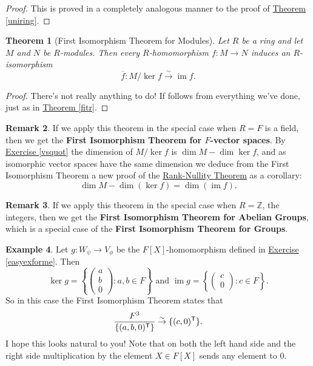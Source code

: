 \documentclass[11pt]{amsbook}
\DeclareMathOperator{\im}{\mathrm{im}}
\newtheorem{theorem}{Theorem}[section]
\theoremstyle{definition}
\newtheorem{rem}[theorem]{Remark}
\newtheorem{ex}[theorem]{Example}
\begin{document}
\begin{proof} This is proved in a completely analogous manner to the proof of \hyperref[uniring]{Theorem \ref{uniring}}.
\end{proof}

\begin{theorem}[First Isomorphism Theorem for Modules] \label{fitm}
Let $R$ be a ring and let $M$ and $N$ be $R$-modules. Then every $R$-homomorphism $f : M\longrightarrow N$ induces an $R$-isomorphism $$\overline{f}: M/\ker f \stackrel{\sim}{\to} \im f.$$
\end{theorem}

\begin{proof}
There's not really anything to do! If follows from everything we've done, just as in \hyperref[fitr]{Theorem \ref{fitr}}.
 \end{proof}

\begin{rem}
If we apply this theorem in the special case when $R= F$ is a field, then we get the {\bf First Isomorphism Theorem for $F$-vector spaces}. By \hyperref[vsquot]{Exercise \ref{vsquot}} the dimension of $M/\ker f$ is $\dim M - \dim \ker f$, and as isomorphic vector spaces have the same dimension we deduce from the First Isomorphism Theorem a new proof of the \hyperref[rnthm]{Rank-Nullity Theorem} as a corollary:
$$\dim M - \dim (\ker f) = \dim (\im f).$$
\end{rem}

\begin{rem}
If we apply this theorem in the special case when $R= \mathbb{Z}$, the integers, then we get the {\bf First Isomorphism Theorem for Abelian Groups}, which is a special case of the {\bf First Isomorphism Theorem for Groups}.
\end{rem}

\begin{ex}
Let $g: W_{\psi} \to V_{\phi}$ be the $F[X]$-homomorphism defined in \hyperref[easyexforme]{Exercise \ref{easyexforme}}. Then $$\ker g = \left\{ \begin{pmatrix} a \\ b\\ 0 \end{pmatrix} : a,b \in F \right\} \text{ and } \im g = \left\{ \begin{pmatrix} c \\ 0 \end{pmatrix} : c\in F\right\}.$$ So in this case the First Isomorphism Theorem states that $$\frac{F^3}{\{ (a,b,0)^{\sf T}\}} \stackrel{\sim}{\to} \{ (c,0)^{\sf T} \}.$$ I hope this looks natural to you! Note that on both the left hand side and the right side multiplication by the element $X\in F[X]$ sends any element to $0$.
\end{ex}
\end{document}
